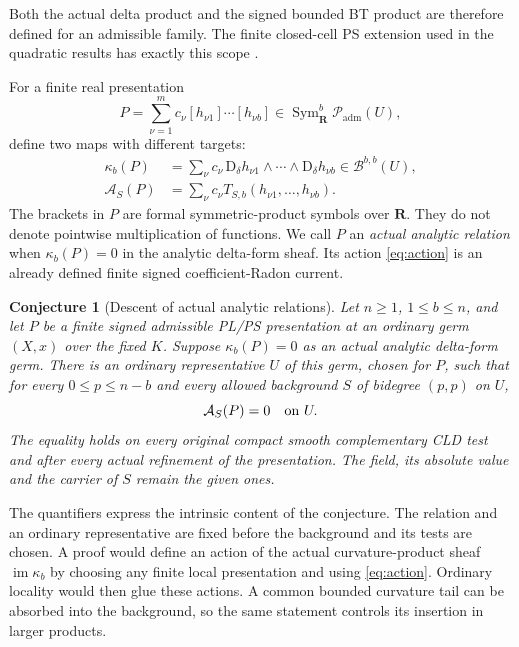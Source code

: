 \documentclass[11pt,a4paper]{article}
\newcommand{\MathEqref}[1]{{\hypersetup{linkcolor=EquationLink}\eqref{#1}}}
\newtheorem{conjecture}[theorem]{Conjecture}
\theoremstyle{definition}
\theoremstyle{remark}
\numberwithin{equation}{section}
\newcommand{\R}{\mathbf R}
\newcommand{\D}{\mathrm D}
\newcommand{\Sym}{\operatorname{Sym}}
\newcommand{\im}{\operatorname{im}}
\newcommand{\A}{\mathcal A}
\newcommand{\B}{\mathscr B}
\begin{document}
Both the actual delta product and the signed bounded BT product are
therefore defined for an admissible family.  The finite closed-cell
PS extension used in the quadratic results has exactly this scope
\cite{I11,QA}.

For a finite real presentation
\[
 P=\sum_{\nu=1}^{m}c_\nu[h_{\nu1}]\cdots[h_{\nu b}]
       \in\Sym^b_{\R}\mathscr P_{\mathrm{adm}}(U),
\]
define two maps with different targets:
\begin{align}
 \kappa_b(P)
   &=\sum_\nu c_\nu\,
          \D_\delta h_{\nu1}\wedge\cdots\wedge
                             \D_\delta h_{\nu b}\in\B^{b,b}(U),
                    \label{eq:kappa}\\
 \A_S(P)
   &=\sum_\nu c_\nu T_{S,b}(h_{\nu1},\ldots,h_{\nu b}).
                    \label{eq:action}
\end{align}
The brackets in $P$ are formal symmetric-product symbols over $\R$.
They do not denote pointwise multiplication of functions.  We call $P$
an \emph{actual analytic relation} when $\kappa_b(P)=0$ in the analytic
delta-form sheaf.  Its action \MathEqref{eq:action} is an already defined
finite signed coefficient-Radon current.

\begin{conjecture}[Descent of actual analytic relations]
\label{conj:descent}
Let $n\ge1$, $1\le b\le n$, and let $P$ be a finite signed admissible
PL/PS presentation at an ordinary germ $(X,x)$ over the fixed $K$.  Suppose
$\kappa_b(P)=0$ as an actual analytic delta-form germ.  There is an
ordinary representative $U$ of this germ, chosen for $P$, such that
for every $0\le p\le n-b$ and every allowed background $S$ of bidegree
$(p,p)$ on $U$,
\begin{equation}
                              \A_S(P)=0\quad\hbox{on }U.
                              \label{eq:main-descent}
\end{equation}
The equality holds on every original compact smooth complementary CLD
test and after every actual refinement of the presentation.  The field,
its absolute value and the carrier of $S$ remain the given ones.
\end{conjecture}

The quantifiers express the intrinsic content of the conjecture.  The
relation and an ordinary representative are fixed before the background
and its tests are chosen.  A proof would define an action of the actual
curvature-product sheaf $\im\kappa_b$ by choosing any finite local
presentation and using \MathEqref{eq:action}.  Ordinary locality would
then glue these actions.  A common bounded curvature tail can be
absorbed into the background, so the same statement controls its
insertion in larger products.
\end{document}
